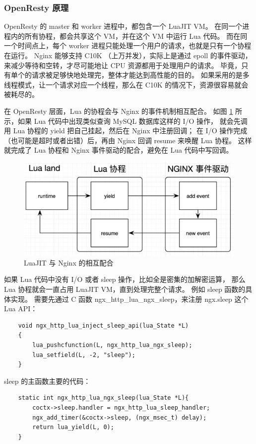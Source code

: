\documentclass[a4,10pt]{ctexart}
\begin{document}
\subsubsection{OpenResty 原理}

OpenResty 的 master 和 worker 进程中，都包含一个 LuaJIT VM。
在同一个进程内的所有协程，都会共享这个 VM，并在这个 VM 中运行 Lua 代码。
而在同一个时间点上，每个 worker 进程只能处理一个用户的请求，也就是只有一个协程在运行。
Nginx 能够支持 C10K （上万并发），实际上是通过 epoll 的事件驱动，
来减少等待和空转，才尽可能地让 CPU 资源都用于处理用户的请求。
毕竟，只有单个的请求被足够快地处理完，整体才能达到高性能的目的。
如果采用的是多线程模式，让一个请求对应一个线程，那么在 C10K 的情况下，资源很容易就会被耗尽的。

在 OpenResty 层面，Lua 的协程会与 Nginx 的事件机制相互配合。
如图 \ref{key6} 所示，如果 Lua 代码中出现类似查询 MySQL 数据库这样的 I/O 操作，
就会先调用 Lua 协程的 yield 把自己挂起，然后在 Nginx 中注册回调；
在 I/O 操作完成（也可能是超时或者出错）后，再由 Nginx 回调 resume 来唤醒 Lua 协程。
这样就完成了 Lua 协程和 Nginx 事件驱动的配合，避免在 Lua 代码中写回调。

\begin{figure}[htbp]
	\centering
	\includegraphics[width=.5\textwidth]{img/nginx/luaJIT_process.png}
	\caption{LuaJIT 与 Nginx 的相互配合}
	\label{key6}
\end{figure}

如果 Lua 代码中没有 I/O 或者 sleep 操作，比如全是密集的加解密运算，
那么 Lua 协程就会一直占用 LuaJIT VM，直到处理完整个请求。
例如 sleep 函数的具体实现。
需要先通过 C 函数 ngx\_http\_lua\_ngx\_sleep，来注册 ngx.sleep 这个 Lua API：

\begin{verbatim}
	void ngx_http_lua_inject_sleep_api(lua_State *L)
	{
		lua_pushcfunction(L, ngx_http_lua_ngx_sleep);
		lua_setfield(L, -2, "sleep");
	}
\end{verbatim}

sleep 的主函数主要的代码：

\begin{verbatim}
	static int ngx_http_lua_ngx_sleep(lua_State *L){
		coctx->sleep.handler = ngx_http_lua_sleep_handler;
		ngx_add_timer(&coctx->sleep, (ngx_msec_t) delay);
		return lua_yield(L, 0);
	}
\end{verbatim}
\end{document}
